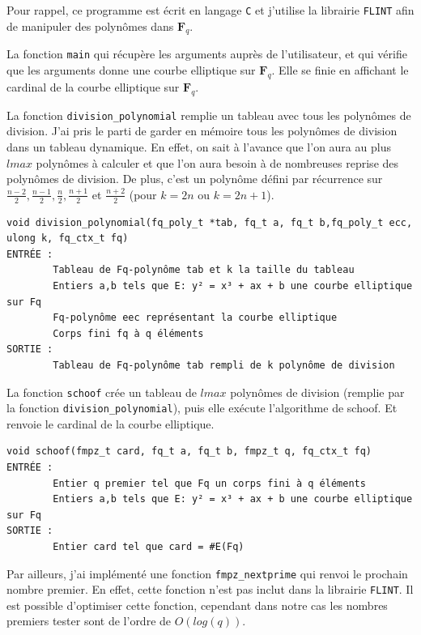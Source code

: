 \documentclass{article}%
\theoremstyle{plain}
\theoremstyle{definition}
\theoremstyle{plain}
\theoremstyle{plain}
\theoremstyle{remark}
\newcommand\fq{\mathbf{F}_{q}}
\begin{document}
Pour rappel, ce programme est écrit en langage \verb|C| et j'utilise la librairie \verb|FLINT| afin de manipuler des polynômes dans $\fq$.
\begin{list}{•}{J'ai choisi de décomposer mon programme en trois parties :}
\item La fonction  \verb|main| qui récupère les arguments auprès de l'utilisateur, et qui vérifie que les arguments donne une courbe elliptique sur $\fq$.
Elle se finie en affichant le cardinal de la courbe elliptique sur $\fq$.
\item La fonction \verb|division_polynomial| remplie un tableau avec tous les polynômes de division.
J'ai pris le parti de garder en mémoire tous les polynômes de division dans un tableau dynamique.
En effet, on sait à l'avance que l'on aura au plus $lmax$ polynômes à calculer et que l'on aura besoin à de nombreuses reprise des polynômes de division.
De plus, c'est un polynôme défini par récurrence sur $\frac{n-2}{2}, \frac{n-1}{2},\frac{n}{2},\frac{n+1}{2}$ et $\frac{n+2}{2}$ (pour $k=2n$ ou $k=2n+1$).


\begin{verbatim}
void division_polynomial(fq_poly_t *tab, fq_t a, fq_t b,fq_poly_t ecc,
ulong k, fq_ctx_t fq)
ENTRÉE :
    	Tableau de Fq-polynôme tab et k la taille du tableau
    	Entiers a,b tels que E: y² = x³ + ax + b une courbe elliptique sur Fq
    	Fq-polynôme eec représentant la courbe elliptique
    	Corps fini fq à q éléments
SORTIE :
    	Tableau de Fq-polynôme tab rempli de k polynôme de division
\end{verbatim} 
\item La fonction \verb|schoof| crée un tableau de $lmax$ polynômes de division (remplie par la fonction \verb|division_polynomial|), puis elle exécute l'algorithme de schoof. Et renvoie le cardinal de la courbe elliptique.
\begin{verbatim}
void schoof(fmpz_t card, fq_t a, fq_t b, fmpz_t q, fq_ctx_t fq)
ENTRÉE :
    	Entier q premier tel que Fq un corps fini à q éléments
    	Entiers a,b tels que E: y² = x³ + ax + b une courbe elliptique sur Fq
SORTIE :
    	Entier card tel que card = #E(Fq)
\end{verbatim} 
\end{list}

Par ailleurs, j'ai implémenté une fonction \verb|fmpz_nextprime| qui renvoi le prochain nombre premier. 
En effet, cette fonction n'est pas inclut dans la librairie \verb|FLINT|. Il est possible d'optimiser cette fonction, cependant dans notre cas les nombres premiers tester sont de l'ordre de $O(log(q))$.
 
\end{document}
